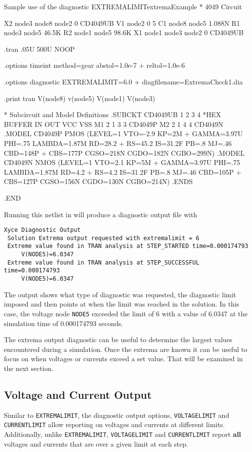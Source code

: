 \begin{NetlistFigure}{Sample use of the diagnostic EXTREMALIMIT}{extremaExample}
* 4049 Circuit

X2 node3 node8 node2 0 CD4049UB
V1 node2 0 5
C1 node8 node5 1.088N
R1 node3 node5 46.5K
R2 node1 node5 98.6K
X1 node1 node3 node2 0 CD4049UB

.tran .05U 500U NOOP

.options timeint method=gear abstol=1.0e-7 
+ reltol=1.0e-6

.options diagnostic EXTREMALIMIT=6.0 
+ diagfilename=ExtremaCheck1.dia

.print tran V(node8) v(node5) V(node1) V(node3)

* Subcircuit and Model Definitions
.SUBCKT CD4049UB 1  2   3   4
*HEX BUFFER    IN OUT VCC VSS
M1 2 1 3 3 CD4049P
M2 2 1 4 4 CD4049N
.MODEL CD4049P PMOS (LEVEL=1 VTO=-2.9 KP=2M 
+ GAMMA=3.97U PHI=.75 LAMBDA=1.87M RD=28.2 
+ RS=45.2 IS=31.2F PB=.8 MJ=.46 CBD=148P 
+ CBS=177P CGSO=218N CGDO=182N CGBO=299N)
.MODEL CD4049N NMOS (LEVEL=1 VTO=2.1 KP=5M 
+ GAMMA=3.97U PHI=.75 LAMBDA=1.87M RD=4.2 
+ RS=4.2 IS=31.2F PB=.8 MJ=.46 CBD=105P 
+ CBS=127P CGSO=156N CGDO=130N CGBO=214N)
.ENDS

.END
\end{NetlistFigure}

Running this netlist in \Xyce{} will produce a diagnostic output file with 
\begin{verbatim}
Xyce Diagnostic Output
 Solution Extrema output requested with extremalimit = 6
 Extreme value found in TRAN analysis at STEP_STARTED time=0.000174793
     V(NODE5)=6.0347
 Extreme value found in TRAN analysis at STEP_SUCCESSFUL time=0.000174793
     V(NODE5)=6.0347
\end{verbatim}

The output shows what type of diagnostic was requested, the diagnostic limit imposed
and then points at when the limit was reached in the solution.  In this case, the 
voltage node \texttt{NODE5} exceeded the limit of 6 with a value of 6.0347 at the 
simulation time of 0.000174793 seconds.

The extrema output diagnostic can be useful to determine the largest values encountered
during a simulation.  Once the extrema are known it can be useful to focus on when 
voltages or currents exceed a set value.  That will be examined in the next section.

\subsection{Voltage and Current Output}
Similar to \texttt{EXTREMALIMIT}, the diagnostic output options, \texttt{VOLTAGELIMIT} and
\texttt{CURRENTLIMIT} allow reporting on voltages and currents at different limits.  Additionally,
unlike \texttt{EXTREMALIMIT}, \texttt{VOLTAGELIMIT} and \texttt{CURRENTLIMIT} report {\bf all} 
voltages and currents that are over a given limit at each step.

